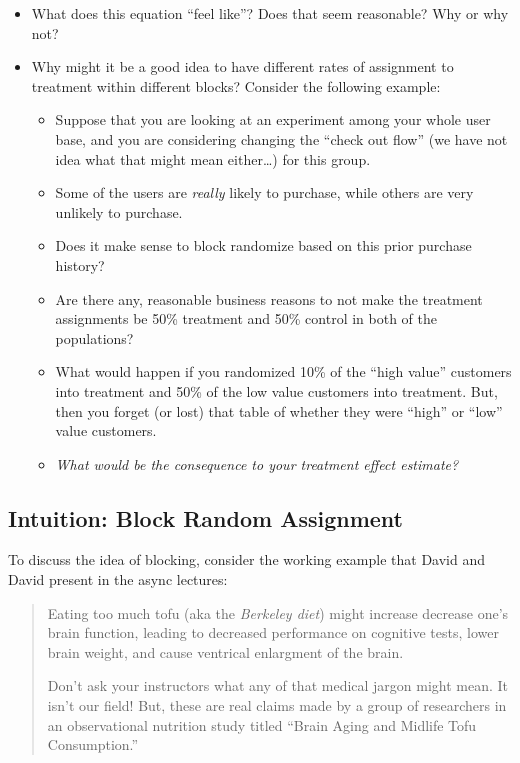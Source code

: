 \documentclass[
]{article}
\providecommand{\tightlist}{%
  \setlength{\itemsep}{0pt}\setlength{\parskip}{0pt}}
\theoremstyle{definition}
\theoremstyle{definition}
\theoremstyle{definition}
\theoremstyle{definition}
\theoremstyle{remark}
\begin{document}
\begin{itemize}
\item
  What does this equation ``feel like''? Does that seem reasonable? Why or why not?
\item
  Why might it be a good idea to have different rates of assignment to treatment within different blocks? Consider the following example:

  \begin{itemize}
  \tightlist
  \item
    Suppose that you are looking at an experiment among your whole user base, and you are considering changing the ``check out flow'' (we have not idea what that might mean either\ldots) for this group.
  \item
    Some of the users are \emph{really} likely to purchase, while others are very unlikely to purchase.
  \item
    Does it make sense to block randomize based on this prior purchase history?
  \item
    Are there any, reasonable business reasons to not make the treatment assignments be 50\% treatment and 50\% control in both of the populations?
  \item
    What would happen if you randomized 10\% of the ``high value'' customers into treatment and 50\% of the low value customers into treatment. But, then you forget (or lost) that table of whether they were ``high'' or ``low'' value customers.
  \item
    \emph{What would be the consequence to your treatment effect estimate?}
  \end{itemize}
\end{itemize}

\subsection{Intuition: Block Random Assignment}\label{intuition-block-random-assignment}

To discuss the idea of blocking, consider the working example that David and David present in the async lectures:

\begin{quote}
Eating too much tofu (aka the \emph{Berkeley diet}) might increase decrease one's brain function, leading to decreased performance on cognitive tests, lower brain weight, and cause ventrical enlargment of the brain.

Don't ask your instructors what any of that medical jargon might mean. It isn't our field! But, these are real claims made by a group of researchers in an observational nutrition study titled ``Brain Aging and Midlife Tofu Consumption.''
\end{quote}
\end{document}
